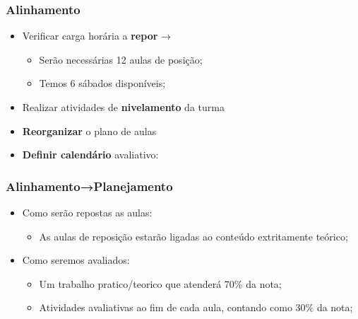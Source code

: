 \documentclass{beamer}
\begin{document}
\begin{frame}
\frametitle{Alinhamento}
\begin{itemize}
\item Verificar carga horária a \textbf{repor} → 
      \begin{itemize}
            \item Serão necessárias 12 aulas de posição;
            \item Temos 6 sábados disponíveis;
      \end{itemize}
\item Realizar atividades de \textbf{nivelamento} da turma
\item \textbf{Reorganizar} o plano de aulas
\item \textbf{Definir calendário} avaliativo:

\end{itemize}
\end{frame}

\begin{frame}

\frametitle{Alinhamento→Planejamento}
\begin{itemize}
      \item Como serão repostas as aulas:
      \begin{itemize}
            \item As aulas de reposição estarão ligadas ao conteúdo extritamente teórico;
      \end{itemize}
      \item Como seremos avaliados:
      \begin{itemize}
            \item Um trabalho pratico/teorico que atenderá 70\% da nota;
            \item Atividades avaliativas ao fim de cada aula, contando como 30\% da nota;
      \end{itemize}

\end{itemize}
\end{frame}

\footlinecolor{}

\backmatter
\end{document}
